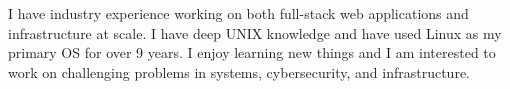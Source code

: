 

\begin{cvparagraph}

I have industry experience working on both full-stack web applications and infrastructure at scale. I have deep UNIX knowledge and have used Linux as my primary OS for over 9 years. I enjoy learning new things and I am interested to work on challenging problems in systems, cybersecurity, and infrastructure.
\end{cvparagraph}

